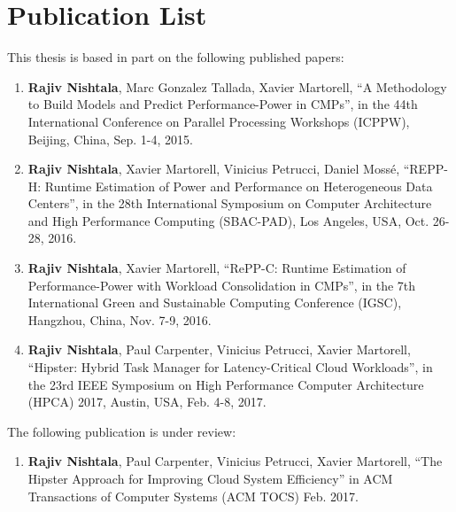 \chapter*{Publication List}

\noindent {} This thesis is based in part on the following published papers:

\begin{enumerate}[leftmargin=*] 
    
     \item[{\small {\circled{1}}}] \textbf{Rajiv Nishtala}, Marc Gonzalez
        Tallada, Xavier Martorell, ``\textsf{A Methodology to Build Models and Predict
        Performance-Power in CMPs}'', in the 44th International Conference on Parallel
        Processing Workshops ({ICPPW}), Beijing, China, Sep. 1-4, 2015.
    
     \item[{\small {\circled{2}}}] \textbf{Rajiv Nishtala}, Xavier Martorell,
        Vinicius Petrucci, Daniel Moss\'e, ``\textsf{REPP-H: Runtime Estimation of Power
        and Performance on Heterogeneous Data Centers}'', in the 28th International
        Symposium on Computer Architecture and High Performance Computing ({SBAC-PAD}),
        Los Angeles, USA, Oct. 26-28, 2016.

     \item[{\small {\circled{3}}}] \textbf{Rajiv Nishtala}, Xavier Martorell,
        ``\textsf{RePP-C: Runtime Estimation of Performance-Power with Workload
        Consolidation in CMPs}'', in the 7th International Green and Sustainable Computing
        Conference ({IGSC}), Hangzhou, China, Nov. 7-9, 2016. 
    
     \item[{\small {\circled{4}}}] \textbf{Rajiv Nishtala}, Paul Carpenter,
        Vinicius Petrucci, Xavier Martorell, ``\textsf{Hipster: Hybrid Task Manager for
        Latency-Critical Cloud Workloads}'', in the 23rd IEEE Symposium on High
        Performance Computer Architecture ({HPCA}) 2017, Austin, USA, Feb. 4-8, 2017.
    

\end{enumerate} 

\noindent {} The following publication is under review:

\begin{enumerate}[leftmargin=*] 
    

    \item[\small {\circled{1}}] \textbf{Rajiv Nishtala}, Paul Carpenter, Vinicius
        Petrucci, Xavier Martorell, ``\textsf{The Hipster Approach for Improving Cloud System Efficiency}''
        in ACM Transactions of Computer Systems ({ACM} {TOCS}) Feb. 2017.

\end{enumerate}

